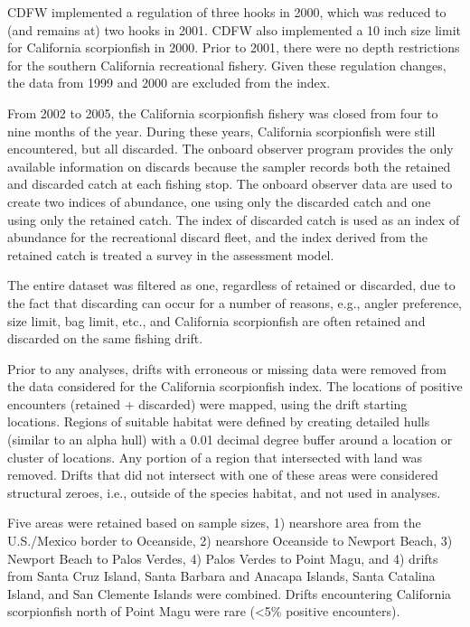 \documentclass[12pt,]{article}
\begin{document}
CDFW implemented a regulation of three hooks in 2000, which was reduced
to (and remains at) two hooks in 2001. CDFW also implemented a 10 inch
size limit for California scorpionfish in 2000. Prior to 2001, there
were no depth restrictions for the southern California recreational
fishery. Given these regulation changes, the data from 1999 and 2000 are
excluded from the index.

From 2002 to 2005, the California scorpionfish fishery was closed from
four to nine months of the year. During these years, California
scorpionfish were still encountered, but all discarded. The onboard
observer program provides the only available information on discards
because the sampler records both the retained and discarded catch at
each fishing stop. The onboard observer data are used to create two
indices of abundance, one using only the discarded catch and one using
only the retained catch. The index of discarded catch is used as an
index of abundance for the recreational discard fleet, and the index
derived from the retained catch is treated a survey in the assessment
model.

The entire dataset was filtered as one, regardless of retained or
discarded, due to the fact that discarding can occur for a number of
reasons, e.g., angler preference, size limit, bag limit, etc., and
California scorpionfish are often retained and discarded on the same
fishing drift.

Prior to any analyses, drifts with erroneous or missing data were
removed from the data considered for the California scorpionfish index.
The locations of positive encounters (retained + discarded) were mapped,
using the drift starting locations. Regions of suitable habitat were
defined by creating detailed hulls (similar to an alpha hull) with a
0.01 decimal degree buffer around a location or cluster of locations.
Any portion of a region that intersected with land was removed. Drifts
that did not intersect with one of these areas were considered
structural zeroes, i.e., outside of the species habitat, and not used in
analyses.

Five areas were retained based on sample sizes, 1) nearshore area from
the U.S./Mexico border to Oceanside, 2) nearshore Oceanside to Newport
Beach, 3) Newport Beach to Palos Verdes, 4) Palos Verdes to Point Magu,
and 4) drifts from Santa Cruz Island, Santa Barbara and Anacapa Islands,
Santa Catalina Island, and San Clemente Islands were combined. Drifts
encountering California scorpionfish north of Point Magu were rare
(\textless{}5\% positive encounters).
\end{document}
